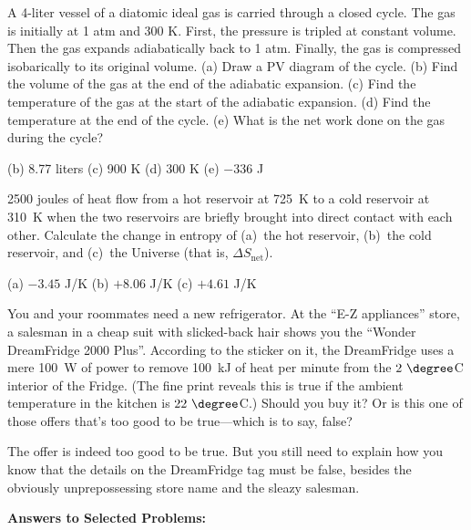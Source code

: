 \begin{Exercise}
A 4-liter vessel of a diatomic ideal gas is carried through a closed cycle.  The gas is initially at 1 atm and 300 K.  First, the pressure is tripled at constant volume.  Then the gas expands adiabatically back to 1 atm.  Finally, the gas is compressed isobarically to its original volume.  (a) Draw a PV diagram of the cycle.  (b) Find the volume of the gas at the end of the adiabatic expansion. (c) Find the temperature of the gas at the start of the adiabatic expansion.  (d)  Find the temperature at the end of the cycle.  (e) What is the net work done on the gas during the cycle?
\end{Exercise}
\begin{Answer}
(b) 8.77 liters (c) 900 K (d) 300 K (e) $-336$ J
\end{Answer}


\begin{Exercise}
2500 joules of heat flow from a hot reservoir at 725~K to a cold reservoir at 310~K when the two reservoirs are briefly brought into direct contact with each other.  Calculate the change in entropy of (a)~the hot reservoir, (b)~the cold reservoir, and 
(c)~the Universe (that is, $\Delta S_\text{net}$).
\end{Exercise}
\begin{Answer}
(a) $-3.45$ J/K (b) $+8.06$ J/K (c) $+4.61$ J/K
\end{Answer}


\begin{Exercise}
You and your roommates need a new refrigerator.  At the ``E-Z appliances'' store, a salesman in a cheap suit with slicked-back hair shows you the ``Wonder DreamFridge 2000 Plus''.  According to the sticker on it, the DreamFridge uses a mere 100~W of power to remove 100~kJ of heat per minute from the $2~\degree$C interior of the Fridge.  (The fine print reveals this is true if the ambient temperature in the kitchen is $22~\degree$C.)  Should you buy it? Or is this one of those offers that's too good to be true---which is to say, false? 
\end{Exercise}
\begin{Answer}
The offer is indeed too good to be true.  But you still need to explain how you know that the details on the DreamFridge tag must be false, besides the obviously unprepossessing store name and the sleazy salesman.
\end{Answer}





\vspace{0.7in}

\textbf{Answers to Selected {\thesubsection} Problems:}
\label{thermo_prob_answers}
\shipoutAnswer

\cleardoublepage
